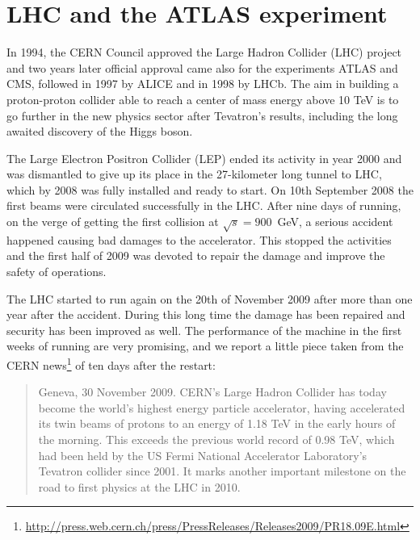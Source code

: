 
\clearpage{\pagestyle{empty}\cleardoublepage}


\chapter{LHC and the ATLAS experiment}\label{chap:atlas}

In 1994, the CERN Council approved the Large Hadron Collider (LHC) project and two years later official approval came also for the experiments ATLAS and CMS, followed in 1997 by ALICE and in 1998 by LHCb. The aim in building a proton-proton collider able to reach a center of mass energy above 10 TeV is to go further in the new physics sector after Tevatron's results, including the long awaited discovery of the Higgs boson.

The Large Electron Positron Collider (LEP) ended its activity in year 2000 and was dismantled to give up its place in the 27-kilometer long tunnel to LHC, which by 2008 was fully installed and ready to start. On 10th September 2008 the first beams were circulated successfully in the LHC. After nine days of running, on the verge of getting the first collision at $\sqrt{s} = 900$~GeV, a serious accident happened causing bad damages to the accelerator. This stopped the activities and the first half of 2009 was devoted to repair the damage and improve the safety of operations.

The LHC started to run again on the 20th of November 2009 after more than one year after the accident. During this long time the damage has been repaired and security has been improved as well. The performance of the machine in the first weeks of running are very promising, and we report a little piece taken from the CERN news\footnote{\url{http://press.web.cern.ch/press/PressReleases/Releases2009/PR18.09E.html}} of ten days after the restart:
\begin{quotation}\small
Geneva, 30 November 2009. CERN's Large Hadron Collider has today become the world’s highest energy particle accelerator, having accelerated its twin beams of protons to an energy of 1.18 TeV in the early hours of the morning. This exceeds the previous world record of 0.98 TeV, which had been held by the US Fermi National Accelerator Laboratory’s Tevatron collider since 2001. It marks another important milestone on the road to first physics at the LHC in 2010.
\end{quotation}


